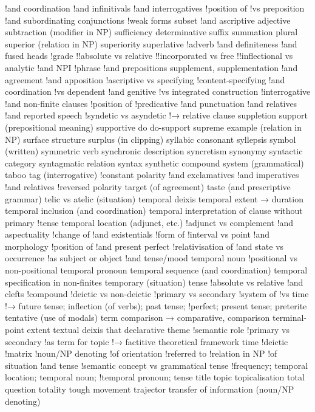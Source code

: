 !and coordination
!and infinitivals
!and interrogatives
!position of
!vs preposition
!and subordinating conjunctions
!weak forms
subset
!and ascriptive adjective
subtraction (modifier in NP)
sufficiency determinative
suffix
summation plural
superior (relation in NP)
superiority
superlative
!adverb
!and definiteness
!and fused heads
!grade
!!absolute vs relative
!!incorporated vs free
!!inflectional vs analytic
!and NPI
!phrase
!and prepositions
supplement, supplementation
!and agreement
!and apposition
!ascriptive vs specifying
!content-specifying
!and coordination
!vs dependent
!and genitive
!vs integrated construction
!interrogative
!and non-finite clauses
!position of
!predicative
!and punctuation
!and relatives
!and reported speech
!syndetic vs asyndetic
!→ relative clause
suppletion
support (prepositional meaning)
supportive do do-support
supreme example (relation in NP)
surface structure
surplus (in clipping)
syllabic consonant
syllepsis
symbol (written)
symmetric verb
synchronic description
syncretism
synonymy
syntactic category
syntagmatic relation
syntax
synthetic compound
system (grammatical)
taboo
tag (interrogative)
!constant polarity
!and exclamatives
!and imperatives
!and relatives
!reversed polarity
target (of agreement)
taste (and prescriptive grammar)
telic vs atelic (situation)
temporal deixis
temporal extent → duration
temporal inclusion (and coordination)
temporal interpretation of clause without primary
!tense
temporal location (adjunct, etc.)
!adjunct vs complement
!and aspectuality
!change of
!and existentials
!form of
!interval vs point
!and morphology
!position of
!and present perfect
!relativisation of
!and state vs occurrence
!as subject or object
!and tense/mood
temporal noun
!positional vs non-positional
temporal pronoun
temporal sequence (and coordination)
temporal specification in non-finites
temporary (situation)
tense
!absolute vs relative
!and clefts
!compound
!deictic vs non-deictic
!primary vs secondary
!system of
!vs time
!→ future tense; inflection (of verbs); past tense;
!perfect; present tense; preterite
tentative (use of modals)
term comparison → comparative, comparison
terminal-point extent
textual deixis
that declarative
theme
!semantic role
!primary vs secondary
!as term for topic
!→ factitive
theoretical framework
time
!deictic
!matrix
!noun/NP denoting
!of orientation
!referred to
!relation in NP
!of situation
!and tense
!semantic concept vs grammatical tense
!frequency; temporal location; temporal noun;
!temporal pronoun; tense
title
topic
topicalisation
total question
totality
tough movement
trajector
transfer of information (noun/NP denoting)
